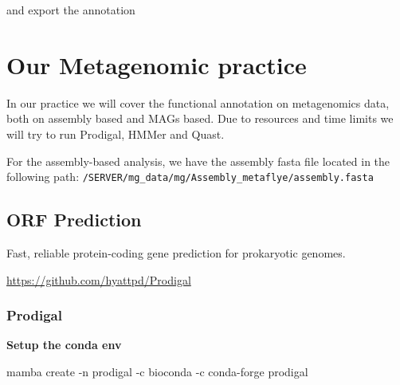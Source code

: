 \documentclass[
]{book}
\newenvironment{Shaded}{\begin{snugshade}}{\end{snugshade}}
\newcommand{\AttributeTok}[1]{\textcolor[rgb]{0.13,0.29,0.53}{#1}}
\newcommand{\BuiltInTok}[1]{#1}
\newcommand{\CommentTok}[1]{\textcolor[rgb]{0.56,0.35,0.01}{\textit{#1}}}
\newcommand{\ControlFlowTok}[1]{\textcolor[rgb]{0.13,0.29,0.53}{\textbf{#1}}}
\newcommand{\ExtensionTok}[1]{#1}
\newcommand{\KeywordTok}[1]{\textcolor[rgb]{0.13,0.29,0.53}{\textbf{#1}}}
\newcommand{\NormalTok}[1]{#1}
\newcommand{\PreprocessorTok}[1]{\textcolor[rgb]{0.56,0.35,0.01}{\textit{#1}}}
\newcommand{\StringTok}[1]{\textcolor[rgb]{0.31,0.60,0.02}{#1}}
\newcommand{\VariableTok}[1]{\textcolor[rgb]{0.00,0.00,0.00}{#1}}
\begin{document}
and export the annotation

\begin{Shaded}
\end{Shaded}

\chapter{Our Metagenomic practice}\label{our-metagenomic-practice}

In our practice we will cover the functional annotation on metagenomics data, both on assembly based and MAGs based. Due to resources and time limits we will try to run Prodigal, HMMer and Quast.

For the assembly-based analysis, we have the assembly fasta file located in the following path: \texttt{/SERVER/mg\_data/mg/Assembly\_metaflye/assembly.fasta}

\section{ORF Prediction}\label{orf-prediction}

Fast, reliable protein-coding gene prediction for prokaryotic genomes.

\url{https://github.com/hyattpd/Prodigal}

\subsection{Prodigal}\label{prodigal}

\textbf{Setup the conda env}

\begin{Shaded}
\begin{Highlighting}[]
\ExtensionTok{mamba}\NormalTok{ create }\AttributeTok{{-}n}\NormalTok{ prodigal }\AttributeTok{{-}c}\NormalTok{ bioconda }\AttributeTok{{-}c}\NormalTok{ conda{-}forge prodigal}
\end{Highlighting}
\end{Shaded}
\end{document}
